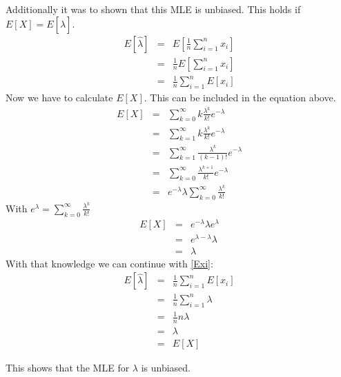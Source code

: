 \documentclass{article}
\begin{document}
Additionally it was to shown that this MLE is unbiased. This holds if $E[X] = E[\hat{\lambda}]$.
\begin{eqnarray}
E[\hat{\lambda}] &=& E\left[\frac{1}{n}\sum_{i = 1}^{n} x_i\right]\\
&=& \frac{1}{n} E\left[\sum_{i = 1}^{n} x_i\right]\\
&=& \frac{1}{n} \sum_{i = 1}^{n}E\left[x_i\right]
\label{Exi}
\end{eqnarray}
Now we have to calculate $E[X]$. This can be included in the equation above.
\begin{eqnarray}
E[X] &=& \sum_{k=0}^{\infty} k\frac{\lambda^k}{k!} e^{-\lambda}\\
&=& \sum_{k=1}^{\infty} k\frac{\lambda^k}{k!} e^{-\lambda}\\
&=& \sum_{k=1}^{\infty} \frac{\lambda^k}{(k-1)!} e^{-\lambda}\\
&=& \sum_{k=0}^{\infty} \frac{\lambda^{k+1}}{k!} e^{-\lambda}\\
&=& e^{-\lambda} \lambda \sum_{k=0}^{\infty} \frac{\lambda^{k}}{k!}
\end{eqnarray}
With $e^\lambda = \sum_{k=0}^{\infty} \frac{\lambda^{k}}{k!}$
\begin{eqnarray}
E[X] &=& e^{-\lambda} \lambda e^{\lambda}\\
&=& e^{\lambda-\lambda} \lambda\\
&=& \lambda
\end{eqnarray}
With that knowledge we can continue with \ref{Exi}:
\begin{eqnarray}
E[\hat{\lambda}] &=& \frac{1}{n} \sum_{i = 1}^{n}E\left[x_i\right]\\
&=& \frac{1}{n} \sum_{i = 1}^{n}\lambda\\
&=& \frac{1}{n} n\lambda\\
&=& \lambda\\
&=& E[X]
\end{eqnarray}

This shows that the MLE for $\lambda$ is unbiased.
\end{document}
